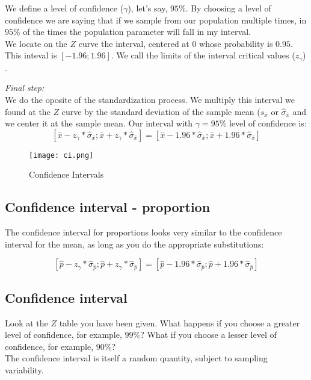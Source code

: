 \documentclass[11pt]{article}
\begin{document}
	We define a level of confidence ($\gamma$), let's say, $95\%$. By choosing a level of confidence we are saying that if we sample from our population multiple times, in $95\%$ of the times the population parameter will fall in my interval.\\
	
	We locate on the $Z$ curve the interval, centered at $0$ whose probability is $0.95$. This inteval is $[-1.96;1.96]$. We call the limits of the interval critical values ($z_\gamma$) .

	\emph{Final step:}\\

	We do the oposite of the standardization process. We multiply this interval we found at the $Z$ curve by the standard deviation of the sample mean ($s_{\bar{x}}$ or $\hat{\sigma}_{\bar{x}}$ and we center it at the sample mean. Our interval with $\gamma = 95\%$ level of confidence is:
	\[[\bar{x}-z_\gamma*\hat{\sigma}_{\bar{x}};\bar{x}+z_\gamma*\hat{\sigma}_{\bar{x}}] = [\bar{x}-1.96*\hat{\sigma}_{\bar{x}};\bar{x}+1.96*\hat{\sigma}_{\bar{x}}]\]

\begin{figure}[htp]
\centering
\texttt{[image: ci.png]}
\caption{Confidence Intervals}
\label{}
\end{figure}

	\subsection*{Confidence interval - proportion}
	
	The confidence interval for proportions looks very similar to the confidence interval for the mean, as long as you do the appropriate substitutions:
	
	\[[\hat{p}-z_\gamma*\hat{\sigma}_{\hat{p}};\hat{p}+z_\gamma*\hat{\sigma}_{\hat{p}}]=[\hat{p}-1.96*\hat{\sigma}_{\hat{p}};\hat{p}+1.96*\hat{\sigma}_{\hat{p}}]\]

	\subsection*{Confidence interval}
	
	Look at the $Z$ table you have been given. What happens if you choose a greater level of confidence, for example, $99\%$? What if you choose a lesser level of confidence, for example, $90\%$?\\

The confidence interval is itself a random quantity, subject to sampling variability.\\
\end{document}
